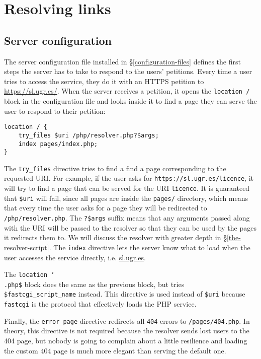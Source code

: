 \chapter{Resolving links}\label{resolving-links}

\section{Server configuration}\label{server-configuration}

The server configuration file installed in \S\ref{configuration-files} defines the first steps the server has to take to respond to the users' petitions.
Every time a user tries to access the service, they do it with an HTTPS petition to \url{https://sl.ugr.es/}.
When the server receives a petition, it opens the \texttt{location /} block in the configuration file and looks inside it to find a page they can serve the user to respond to their petition:

\begin{lstlisting}
location / {
	try_files $uri /php/resolver.php?$args;
	index pages/index.php;
}
\end{lstlisting}

The \texttt{try\_files} directive tries to find a find a page corresponding to the requested URI.
For example, if the user asks for \texttt{https://sl.ugr.es/licence}, it will try to find a page that can be served for the URI \texttt{licence}.
It is guaranteed that \texttt{\$uri} will fail, since all pages are inside the \texttt{pages/} directory, which means that every time the user asks for a page they will be redirected to \texttt{/php/resolver.php}.
The \texttt{?\$args} suffix means that any arguments passed along with the URI will be passed to the resolver so that they can be used by the pages it redirects them to.
We will discuss the resolver with greater depth in \S\ref{the-resolver-script}.
The \texttt{index} directive lets the server know what to load when the user accesses the service directly, i.e. \url{sl.ugr.es}.

The \texttt{location \mysim\char`\\.php\$} block does the same as the previous block, but tries \texttt{\$fastcgi\_script\_name} instead.
This directive is used instead of \texttt{\$uri} because \texttt{fastcgi} is the protocol that effectively loads the PHP service.

Finally, the \texttt{error\_page} directive redirects all \texttt{404} errors to \texttt{/pages/404.php}.
In theory, this directive is not required because the resolver sends lost users to the 404 page, but nobody is going to complain about a little resilience and loading the custom 404 page is much more elegant than serving the default one.


